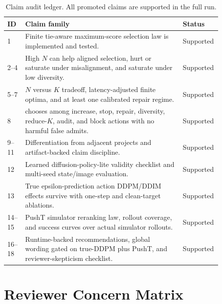 \begin{table}[h]
\caption{Claim audit ledger. All promoted claims are supported in the full run.}
\label{tab:claim-ledger}
\centering
\small
\begin{tabular}{@{}p{0.07\linewidth}p{0.70\linewidth}p{0.10\linewidth}@{}}
\toprule
ID & Claim family & Status \\
\midrule
1 & Finite tie-aware maximum-score selection law is implemented and tested. & Supported \\
2--4 & High $N$ can help aligned selection, hurt or saturate under misalignment, and saturate under low diversity. & Supported \\
5--7 & $N$ versus $K$ tradeoff, latency-adjusted finite optima, and at least one calibrated repair regime. & Supported \\
8 & \ats{} chooses among increase, stop, repair, diversity, reduce-$K$, audit, and block actions with no harmful false admits. & Supported \\
9--11 & Differentiation from adjacent projects and artifact-backed claim discipline. & Supported \\
12 & Learned diffusion-policy-lite validity checklist and multi-seed state/image evaluation. & Supported \\
13 & True epsilon-prediction action DDPM/DDIM effects survive with one-step and clean-target ablations. & Supported \\
14--15 & PushT simulator reranking law, rollout coverage, and success curves over actual simulator rollouts. & Supported \\
16--18 & Runtime-backed recommendations, global wording gated on true-DDPM plus PushT, and reviewer-skepticism checklist. & Supported \\
\bottomrule
\end{tabular}
\end{table}

\section{Reviewer Concern Matrix}
\label{app:concerns}

